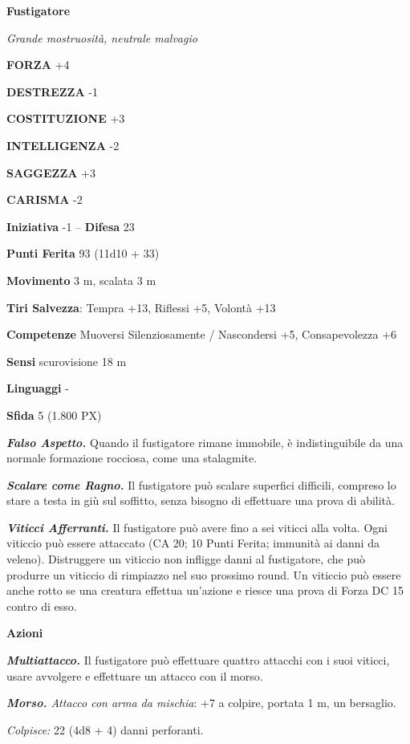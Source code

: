 \begin{multicols}{2}
	\medskip{}\textbf{Fustigatore}

	\textit{Grande mostruosità, neutrale malvagio}

	\textbf{FORZA} +4

	\textbf{DESTREZZA} -1

	\textbf{COSTITUZIONE} +3

	\textbf{INTELLIGENZA} -2

	\textbf{SAGGEZZA} +3

	\textbf{CARISMA} -2

	\textbf{Iniziativa} -1 -- \textbf{Difesa} 23

	\textbf{Punti Ferita} 93 (11d10 + 33)

	\textbf{Movimento} 3 m, scalata 3 m

	\textbf{Tiri Salvezza}: Tempra +13, Riflessi +5, Volontà +13

	\textbf{Competenze} Muoversi Silenziosamente / Nascondersi +5, Consapevolezza +6

	\textbf{Sensi} scurovisione 18 m

	\textbf{Linguaggi} -

	\textbf{Sfida} 5 (1.800 PX)

	\textit{\textbf{Falso Aspetto.}} Quando il fustigatore rimane immobile, è indistinguibile da una normale formazione rocciosa, come una stalagmite.

	\textit{\textbf{Scalare come Ragno.}} Il fustigatore può scalare superfici difficili, compreso lo stare a testa in giù sul soffitto, senza bisogno di effettuare una prova di abilità.

	\textit{\textbf{Viticci Afferranti.}} Il fustigatore può avere fino a sei viticci alla volta. Ogni viticcio può essere attaccato (CA 20; 10 Punti Ferita; immunità ai danni da veleno). Distruggere un viticcio non infligge danni al fustigatore, che può produrre un viticcio di rimpiazzo nel suo prossimo round. Un viticcio può essere anche rotto se una creatura effettua un'azione e riesce una prova di Forza DC 15 contro di esso.

	\textbf{Azioni}

	\textit{\textbf{Multiattacco.}} Il fustigatore può effettuare quattro attacchi con i suoi viticci, usare avvolgere e effettuare un attacco con il morso.

	\textit{\textbf{Morso.} Attacco con arma da mischia}: +7 a colpire, portata 1 m, un bersaglio.

	\textit{Colpisce:} 22 (4d8 + 4) danni perforanti.


\end{multicols}
